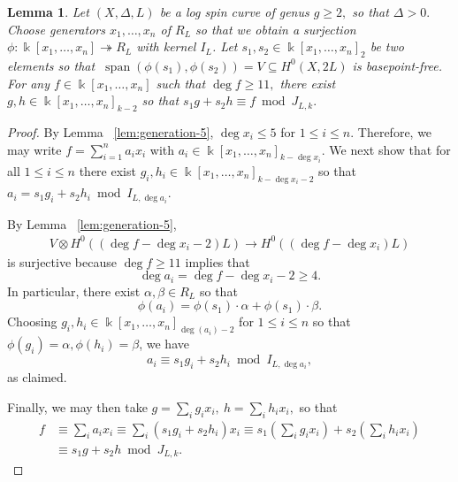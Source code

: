 \documentclass{amsart}
\theoremstyle{plain}
\newtheorem{lem}[thm]{Lemma}
\theoremstyle{definition}
\theoremstyle{remark}
\numberwithin{equation}{section}
\newcommand\Bk{{\Bbbk}}
\newcommand{\halfcan}{L}
\DeclareMathOperator{\newspan}{span}
\begin{document}
\begin{lem}
\label{lem:reducing-degree}
Let $(X, \Delta, \halfcan)$ be a log spin curve of genus $g \geq 2,$ so
that $\Delta > 0.$ Choose generators $x_1, \ldots, x_n$ of $R_\halfcan$ so
that we obtain a surjection $\phi: \Bk[x_1, \ldots, x_n]
\twoheadrightarrow R_\halfcan$ with kernel $I_L$. Let $s_1, s_2 \in \Bk[x_1,
\ldots, x_n]_2$ be two elements so that $\: \newspan(\phi(s_1), \phi(s_2))
= V \subseteq H^0(X, 2\halfcan)$ is basepoint-free. For any $f \in
\Bk[x_1, \ldots, x_n]$ such that $\deg f \geq 11,$ there exist $g, h \in
\Bk[x_1, \ldots, x_n]_{k - 2}$ so that $s_1 g + s_2 h \equiv f \bmod J_{\halfcan, k}.$
\end{lem}
\begin{proof}
By Lemma ~\ref{lem:generation-5}, $\deg x_i \leq 5$ for $1 \leq i \leq n$. Therefore, we may write $f = \sum_{i = 1}^{n}a_i x_i$ with $a_i \in \Bk[x_1, \ldots, x_n]_{k-\deg x_i}$.
We next show that for all $1 \leq i \leq n$ there exist $g_i, h_i \in \Bk[x_1, \ldots, x_n]_{k - \deg x_i - 2}$ so that $a_i = s_1g_i + s_2h_i \bmod I_{\halfcan, \deg a_i}.$ 

By Lemma ~\ref{lem:generation-5},
\begin{align*}
	V \otimes H^0((\deg f-\deg x_i -2)\halfcan) \rightarrow H^0((\deg f-\deg x_i)\halfcan)
\end{align*}
is surjective because $\deg f \geq 11$ implies that
$$\deg a_i =\deg f - \deg x_i -2 \geq 4.$$
In particular, there exist $\alpha, \beta \in R_L$ so that
$$\phi(a_i) = \phi(s_1) \cdot \alpha + \phi(s_1) \cdot \beta.$$ 
Choosing $g_i,h_i\in \Bk[x_1, \ldots, x_n]_{\deg(a_i)-2}$ for $1 \leq i \leq n$ so that $\phi(g_i) = \alpha, \phi(h_i) = \beta$, we have 
$$a_i \equiv s_1 g_i + s_2 h_i \bmod I_{\halfcan, \deg a_i},$$ as claimed.

Finally, we may then take $g = \sum_{i}^{}g_i x_i, \: h = \sum_{i}^{}h_i x_i,$ so that 
\begin{align*}
	f &\equiv \sum_{i}^{}a_i x_i \equiv \sum_{i}^{}(s_1g_i + s_2h_i)x_i \equiv s_1 \left( \sum_{i}^{}g_i x_i \right) + s_2 \left( \sum_{i}^{}h_i x_i \right) \\
	&\equiv s_1 g + s_2 h \bmod J_{L,k}.
\end{align*}
\end{proof}
\end{document}
